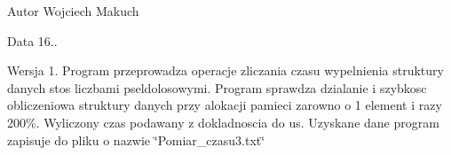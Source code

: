 \begin{DoxyAuthor}{Autor}
Wojciech Makuch 
\end{DoxyAuthor}
\begin{DoxyDate}{Data}
16.. 
\end{DoxyDate}
\begin{DoxyVersion}{Wersja}
1. Program przeprowadza operacje zliczania czasu wypelnienia struktury danych stos liczbami pseldolosowymi. Program sprawdza dzialanie i szybkosc obliczeniowa struktury danych przy alokacji pamieci zarowno o 1 element i razy 200\%. Wyliczony czas podawany z dokladnoscia do us. Uzyskane dane program zapisuje do pliku o nazwie \char`\"{}\+Pomiar\+\_\+czasu3.\+txt\char`\"{} 
\end{DoxyVersion}
